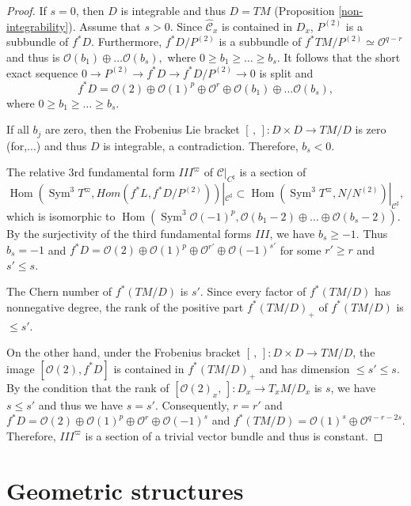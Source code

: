 \documentclass[12pt]{amsart}
\theoremstyle{plain}
\theoremstyle{definition}
\def\Sym{\operatorname{Sym}}
\def\Hom{\operatorname{Hom}}
\begin{document}
\begin{proof}   If $s =0$, then $D$ is integrable and thus $D=TM$  (Proposition \ref{non-integrability}).
Assume that $s >0$.
Since $\widehat {\mathcal C}_x $ is contained in $D_x$, $P^{(2)}$ is a subbundle of $f^*D$. Furthermore, $f^*D/P^{(2)}$ is a subbundle of $f^*TM/P^{(2)}\simeq \mathcal O^{q-r}$ and thus is $\mathcal O(b_1)\oplus \dots \mathcal O(b_s) ,$  where $0 \geq b_1 \geq\dots \geq b_s$. It follows that the short exact sequence $0 \rightarrow P^{(2)}\rightarrow f^*D \rightarrow f^* D/P^{(2)} \rightarrow 0$ is split and
$$f^*D = \mathcal O(2) \oplus \mathcal O(1)^p \oplus  \mathcal O^r \oplus \mathcal O(b_1)\oplus \dots \mathcal O(b_s) ,$$ where $0 \geq b_1 \geq\dots \geq b_s$.

If all $b_j$ are zero, then the Frobenius Lie bracket $[\,,\,]: D \times D \rightarrow TM/D$ is zero (for,...) and thus $D$ is integrable, a contradiction. Therefore, $b_s<0$.

The relative 3rd fundamental form $III^{\varpi}$ of $\mathcal C|_{C^{\sharp}}$ is a section of $$\Hom(\Sym^3 T^{\varpi}, Hom(f^*L, f^*D/P^{(2)}))|_{\mathcal C^{\sharp}} \subset \Hom(\Sym^3 T^{\varpi}, N/N^{(2)})|_{\mathcal C^{\sharp}}, $$
  which is isomorphic to $\Hom(\Sym^3\mathcal O(-1)^p,  \mathcal O(b_1-2) \oplus \dots \oplus \mathcal O(b_s -2))$. By the surjectivity of the third fundamental forms $III$, we have $b_s \geq -1$. Thus $b_s=-1$ and $f^*D = \mathcal O(2) \oplus \mathcal O(1)^p \oplus \mathcal O^{r'}  \oplus \mathcal O(-1)^{s'}$ for some $r' \geq r$ and $s' \leq s$.

The Chern number of $f^*(TM/D)$ is $s'$. Since every factor of $f^*(TM/D)$ has nonnegative degree, the rank of the positive part $f^*(TM/D)_+$ of $f^*(TM/D)$ is $\leq s'$.

On the other hand, under the Frobenius bracket $[\,,\,] :D \times D \rightarrow TM/D$, the image $[\mathcal O(2), f^*D ] $ is contained in $f^*(TM/D)_+$ and has dimension $\leq s' \leq s$. By the condition that the rank of $[\mathcal O(2)_x, \,]:D_x \rightarrow T_xM/D_x$ is $s$, we have  $s \leq s'$ and thus we have $s=s'$. Consequently, $r=r'$ and $f^* D= \mathcal O(2) \oplus \mathcal O(1)^p \oplus \mathcal O^r \oplus \mathcal O(-1)^s$ and $f^*(TM/D) = \mathcal O(1)^s \oplus \mathcal O^{q-r-2s}$. Therefore, $III^{\varpi}$ is a section of a trivial vector bundle and thus is constant.
\end{proof}




\section{Geometric structures} \label{sect:geometric structures}
\end{document}
